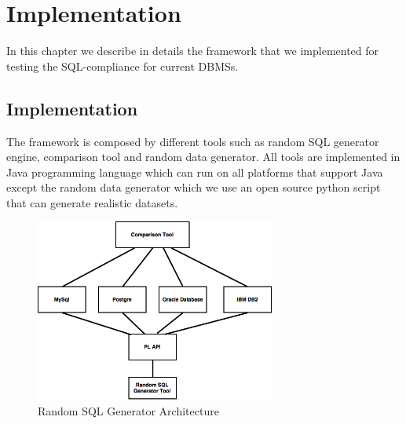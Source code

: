 \chapter{Implementation}
In this chapter we describe in details the framework that we implemented for testing the SQL-compliance for current DBMSs.


\section{Implementation}
The framework is composed by different tools such as random SQL generator engine, comparison tool and random data generator.  All tools are implemented in Java programming language which can run on all platforms that support Java except the random data generator which we use an open source python script that can generate realistic datasets.

 \begin{figure} 
      \centering
      \includegraphics[width=\textwidth,height=6cm]{Images/Chapter4/1-implemen_detail}
      \caption{Random SQL Generator Architecture}
      \label{fig:counting-methods}
    \end{figure}

